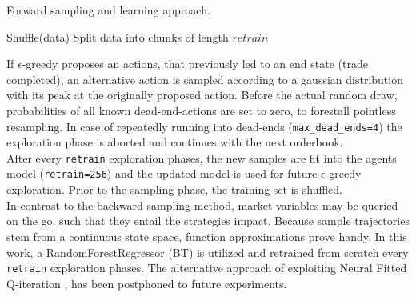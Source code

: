 \begin{algorithm}[H] 
 \caption{Forward sampling and learning approach.}
     \SetAlgoLined
     \footnotesize
     

Shuffle(data)\;
Split data into chunks of length $retrain$


\label{alg:forward:pseudocode}
\end{algorithm}\bigskip

If $\epsilon$-greedy proposes an actions, that previously led to an end state (\ie trade completed), an alternative action is sampled according to a gaussian distribution with its peak at the originally proposed action. Before the actual random draw, probabilities of all known dead-end-actions are set to zero, to forestall pointless resampling. In case of repeatedly running into dead-ends (\eg \lstinline!max_dead_ends=4!) the exploration phase is aborted and continues with the next orderbook.\\

After every \lstinline!retrain! exploration phases, the new samples are fit into the agents model (\eg \lstinline!retrain=256!) and the updated model is used for future $\epsilon$-greedy exploration. Prior to the sampling phase, the training set is shuffled.\\

In contrast to the backward sampling method, market variables may be queried on the go, such that they entail the strategies impact. Because sample trajectories stem from a continuous state space, function approximations prove handy. In this work, a RandomForestRegressor (\ie \ac{BT}) is utilized and retrained from scratch every \lstinline!retrain! exploration phases. The alternative approach of exploiting Neural Fitted Q-iteration \Cite{Riedmiller:2005:NFQ}, has been postphoned to future experiments.\\











\cleardoublepage{}